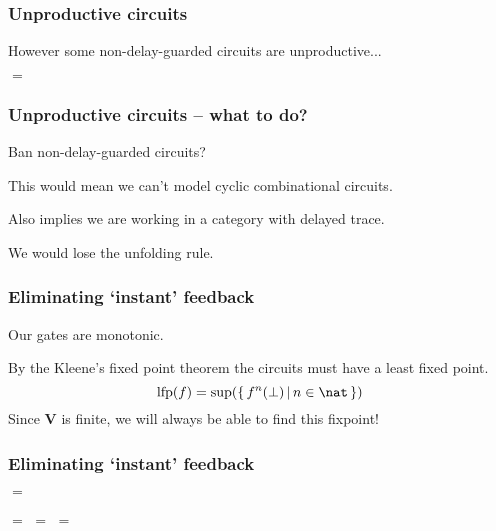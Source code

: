 \begin{frame}
    \frametitle{Unproductive circuits}

    However some non-delay-guarded circuits \alert{are} unproductive...

    \begin{center}
        \pause
        \pause
        \quad$=$\quad

    \end{center}

\end{frame}

\begin{frame}
    \frametitle{Unproductive circuits -- what to do?}

    Ban non-delay-guarded circuits?

    \pause

    This would mean we can't model cyclic combinational circuits.

    \pause

    Also implies we are working in a category with \alert{delayed trace}.
    
    \pause

    We would lose the \alert{unfolding} rule.

\end{frame}

\begin{frame}
    \frametitle{Eliminating `instant' feedback}

    \pause

    Our gates are \alert{monotonic}.

    \pause

    By the \alert{Kleene's fixed point theorem} the circuits must have a \alert
    {least fixed point}.
    \pause
    \[\text{lfp}(f) = \text{sup}(\{\,f^n(\bot) \,|\, n \in \nat\,\})\]
    \pause
    Since $\textbf{V}$ is finite, we will always be able to find this fixpoint!
\end{frame}

\begin{frame}
    \frametitle{Eliminating `instant' feedback}

    
    \begin{center}
        \pause
        \quad$=$\quad

        \vspace{1em}

        \pause
        \quad$=$\quad
        \pause
        \quad$=$\quad
        \pause
        \quad$=$\quad
    \end{center}


\end{frame}

